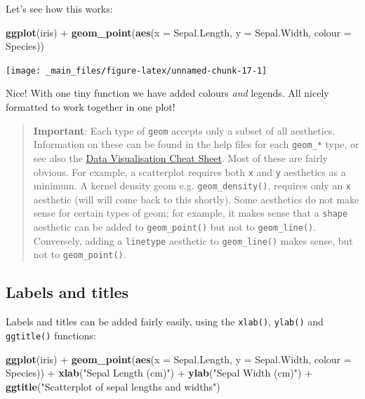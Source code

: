 \documentclass[]{book}
\newenvironment{Shaded}{\begin{snugshade}}{\end{snugshade}}
\newcommand{\KeywordTok}[1]{\textcolor[rgb]{0.13,0.29,0.53}{\textbf{{#1}}}}
\newcommand{\DataTypeTok}[1]{\textcolor[rgb]{0.13,0.29,0.53}{{#1}}}
\newcommand{\StringTok}[1]{\textcolor[rgb]{0.31,0.60,0.02}{{#1}}}
\newcommand{\NormalTok}[1]{{#1}}
\theoremstyle{definition}
\theoremstyle{definition}
\theoremstyle{definition}
\theoremstyle{remark}
\begin{document}
Let's see how this works:

\begin{Shaded}
\begin{Highlighting}[]
\KeywordTok{ggplot}\NormalTok{(iris) +}
\StringTok{    }\KeywordTok{geom_point}\NormalTok{(}\KeywordTok{aes}\NormalTok{(}\DataTypeTok{x =} \NormalTok{Sepal.Length, }\DataTypeTok{y =} \NormalTok{Sepal.Width, }\DataTypeTok{colour =} \NormalTok{Species))}
\end{Highlighting}
\end{Shaded}

\begin{center}\texttt{[image: \_main\_files/figure-latex/unnamed-chunk-17-1]} \end{center}

Nice! With one tiny function we have added colours \emph{and} legends.
All nicely formatted to work together in one plot!

\begin{quote}
\textbf{Important}: Each type of \texttt{geom} accepts only a subset of
all aesthetics. Information on these can be found in the help files for
each \texttt{geom\_*} type, or see also the
\href{https://github.com/rstudio/cheatsheets/raw/master/data-visualization-2.1.pdf}{Data
Visualisation Cheat Sheet}. Most of these are fairly obvious. For
example, a scatterplot requires both \texttt{x} and \texttt{y}
aesthetics as a minimum. A kernel density geom e.g.
\texttt{geom\_density()}, requires only an \texttt{x} aesthetic (will
will come back to this shortly). Some aesthetics do not make sense for
certain types of geom; for example, it makes sense that a \texttt{shape}
aesthetic can be added to \texttt{geom\_point()} but not to
\texttt{geom\_line()}. Conversely, adding a \texttt{linetype} aesthetic
to \texttt{geom\_line()} makes sense, but not to \texttt{geom\_point()}.
\end{quote}

\subsection{Labels and titles}\label{labels-and-titles}

Labels and titles can be added fairly easily, using the \texttt{xlab()},
\texttt{ylab()} and \texttt{ggtitle()} functions:

\begin{Shaded}
\begin{Highlighting}[]
\KeywordTok{ggplot}\NormalTok{(iris) +}
\StringTok{    }\KeywordTok{geom_point}\NormalTok{(}\KeywordTok{aes}\NormalTok{(}\DataTypeTok{x =} \NormalTok{Sepal.Length, }\DataTypeTok{y =} \NormalTok{Sepal.Width, }\DataTypeTok{colour =} \NormalTok{Species)) +}\StringTok{ }\KeywordTok{xlab}\NormalTok{(}\StringTok{"Sepal Length (cm)"}\NormalTok{) +}\StringTok{ }\KeywordTok{ylab}\NormalTok{(}\StringTok{"Sepal Width (cm)"}\NormalTok{) +}
\StringTok{    }\KeywordTok{ggtitle}\NormalTok{(}\StringTok{"Scatterplot of sepal lengths and widths"}\NormalTok{)}
\end{Highlighting}
\end{Shaded}
\end{document}
